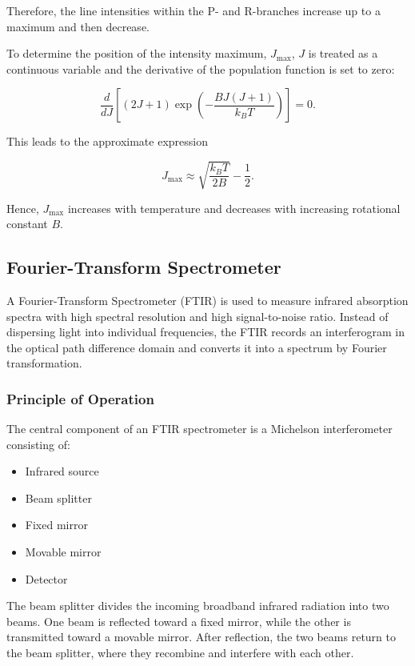 Therefore, the line intensities within the P- and R-branches increase
up to a maximum and then decrease.

To determine the position of the intensity maximum, $J_{\text{max}}$,
$J$ is treated as a continuous variable and the derivative of the
population function is set to zero:

\begin{equation}
    \frac{d}{dJ}
\left[
(2J+1)
\exp\left(-\frac{B J(J+1)}{k_B T}\right)
\right]
= 0.
\end{equation}


This leads to the approximate expression

\begin{equation}
J_{\text{max}}
\approx
\sqrt{\frac{k_B T}{2B}}
-
\frac{1}{2}.
\label{equation:Temperature of gas}
\end{equation}

Hence, $J_{\text{max}}$ increases with temperature and decreases
with increasing rotational constant $B$.


\subsection{Fourier-Transform Spectrometer}

A Fourier-Transform Spectrometer (FTIR) is used to measure infrared
absorption spectra with high spectral resolution and high
signal-to-noise ratio. Instead of dispersing light into individual
frequencies, the FTIR records an interferogram in the optical path
difference domain and converts it into a spectrum by Fourier
transformation.

\subsubsection*{Principle of Operation}

The central component of an FTIR spectrometer is a Michelson
interferometer consisting of:

\begin{itemize}
    \item Infrared source
    \item Beam splitter
    \item Fixed mirror
    \item Movable mirror
    \item Detector
\end{itemize}

The beam splitter divides the incoming broadband infrared radiation
into two beams. One beam is reflected toward a fixed mirror,
while the other is transmitted toward a movable mirror.
After reflection, the two beams return to the beam splitter, where they recombine and interfere with each other.

